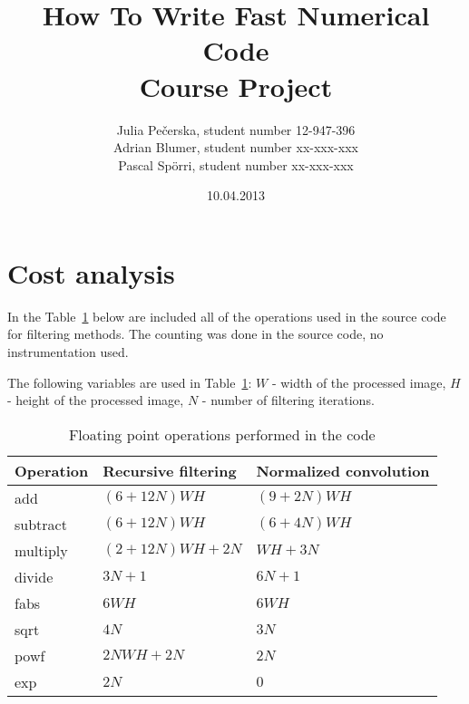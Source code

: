 \documentclass[11pt,a4paper]{article}
\title{How To Write Fast Numerical Code\\ Course Project}
\author{Julia Pe\v{c}erska, student number 12-947-396 \\ Adrian Blumer, student number xx-xxx-xxx \\ Pascal Sp\"{o}rri, student number xx-xxx-xxx}
\date{10.04.2013}
\begin{document}
\maketitle
\section{Cost analysis}

In the Table~\ref{tab:cost_an} below are included all of the operations used in the source code for filtering methods. The counting was done in the source code, no instrumentation used.

The following variables are used in Table~\ref{tab:cost_an}: $W$ - width of the processed image, $H$ - height of the processed image, $N$ - number of filtering iterations.


\begin{table}[h]
\label{tab:cost_an}
\centering
\begin{tabular}{| l | l | l |} \hline 
Operation & Recursive filtering & Normalized convolution \\ \hline
add & $(6 + 12 N) W H$ & $(9 + 2 N) W H$ \\ \hline
subtract & $(6 + 12 N) W H$ & $(6 + 4 N) W H$ \\ \hline
multiply & $(2 + 12 N) W H + 2 N$ & $W H + 3 N$ \\ \hline
divide & $3 N + 1$ & $6 N + 1$ \\ \hline
fabs & $6 W H$ & $6 W H$ \\ \hline
sqrt & $4 N$ & $3 N$ \\ \hline
powf & $2 N W H + 2 N$ & $2 N$ \\ \hline
exp & $2 N$ & $0$ \\ \hline
\end{tabular}
\caption{Floating point operations performed in the code}
\end{table}
\end{document}
